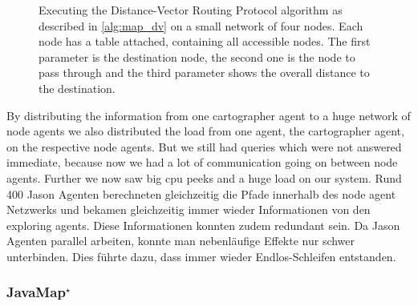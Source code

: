 \begin{figure}
  \caption{Executing the Distance-Vector Routing Protocol algorithm as described in \autoref{alg:map_dv} on a small network of four nodes. Each node has a table attached, containing all accessible nodes. The first parameter is the destination node, the second one is the node to pass through and the third parameter shows the overall distance to the destination.}
  \label{fig:dv}
\end{figure}

By distributing the information from one cartographer agent to a huge network of node agents we also distributed the load from one agent, the cartographer agent, on the respective node agents. But we still had queries which were not answered immediate, because now we had a lot of communication going on between node agents. Further we now saw big cpu peeks and a huge load on our system. Rund 400 Jason Agenten berechneten gleichzeitig die Pfade innerhalb des node agent Netzwerks und bekamen gleichzeitig immer wieder Informationen von den exploring agents. Diese Informationen konnten zudem redundant sein. Da Jason Agenten parallel arbeiten, konnte man nebenläufige Effekte nur schwer unterbinden. Dies führte dazu, dass immer wieder Endlos-Schleifen entstanden.

\subsubsection[JavaMap]{JavaMap$^\star$}\label{alg:map_javamap}